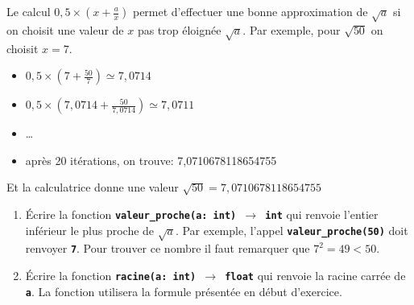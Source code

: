 \documentclass[a4paper,11pt]{article}
\begin{document}
\begin{exo}
    Le calcul $0,5×(x+\frac{a}{x})$ permet d'effectuer une bonne approximation de $\sqrt{a}$ si on choisit une valeur de $x$ pas trop éloignée $\sqrt{a}$. Par exemple, pour $\sqrt{50}$ on choisit $x=7$.
    \begin{itemize}
        \item $0,5×(7+\frac{50}{7})\simeq 7,0714$
        \item $0,5×(7,0714+\frac{50}{7,0714})\simeq 7,0711$
        \item \dots
        \item après 20 itérations, on trouve: 7,0710678118654755
    \end{itemize}
    Et la calculatrice donne une valeur $\sqrt{50}=7,0710678118654755$
    \begin{enumerate}
        \item Écrire la fonction \textbf{\texttt{valeur\_proche(a: int) $\rightarrow$ int}} qui renvoie l'entier inférieur le plus proche de $\sqrt{a}$. Par exemple, l'appel \textbf{\texttt{valeur\_proche(50)}} doit renvoyer \textbf{\texttt{7}}. Pour trouver ce nombre il faut remarquer que $7^2 = 49 < 50$.
        \item Écrire la fonction \textbf{\texttt{racine(a: int) $\rightarrow$ float}} qui renvoie la racine carrée de \textbf{\texttt{a}}. La fonction utilisera la formule présentée en début d'exercice.
    \end{enumerate}
\end{exo}
\end{document}

